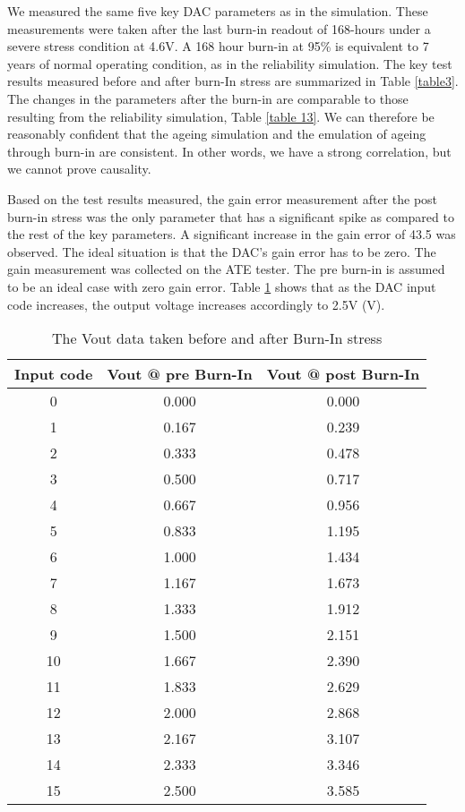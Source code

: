 \documentclass[11pt,a4paper]{article}
\begin{document}
We measured the same five key DAC parameters as in the simulation. These measurements were taken after the last burn-in readout of 168-hours under a severe stress condition at 4.6V. A 168 hour burn-in at 95\% is equivalent to 7 years of normal operating condition, as in the reliability simulation. The key test results measured before and after burn-In stress are summarized in Table \ref{table3}. The changes in the parameters after the burn-in are comparable to those resulting from the reliability simulation, Table \ref{table 13}. We can therefore be reasonably confident that the ageing simulation and the emulation of ageing through burn-in are consistent. In other words, we have a strong correlation, but we cannot prove causality.

Based on the test results measured, the gain error measurement after the post burn-in stress was the only parameter that has a significant spike as compared to the rest of the key parameters. A significant increase in the gain error of 43.5 was observed. The ideal situation is that the DAC's gain error has to be zero. The gain measurement was collected on the ATE tester. The pre burn-in is assumed to be an ideal case with zero gain error. Table \ref{table4} shows that as the DAC input code increases, the output voltage increases accordingly to 2.5V (V). 

\begin{table}[t]
\centering
\caption{The Vout data taken before and after Burn-In stress}
\label{table4}
\begin{tabular}{|c|c|c|}\hline
Input code&Vout @ pre Burn-In&Vout @ post Burn-In\\
\hline
0&0.000&0.000\\
1&0.167&0.239\\
2&0.333&0.478\\
3&0.500&0.717\\
4&0.667&0.956\\
5&0.833&1.195\\
6&1.000&1.434\\
7&1.167&1.673\\
8&1.333&1.912\\
9&1.500&2.151\\
10&1.667&2.390\\
11&1.833&2.629\\
12&2.000&2.868\\
13&2.167&3.107\\
14&2.333&3.346\\
15&2.500&3.585\\
\hline
\end{tabular}


\end{table}
\end{document}
